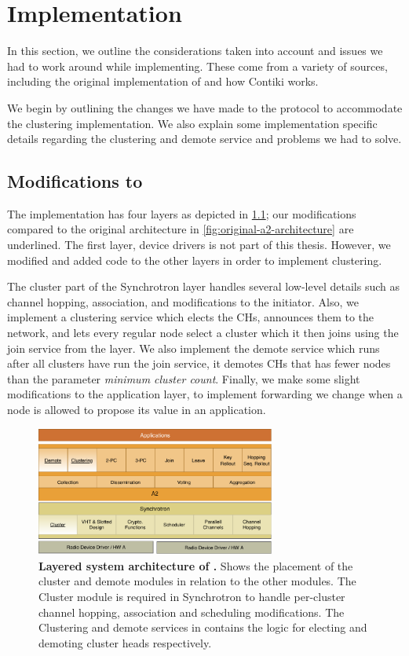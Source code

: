 \chapter{Implementation}
\label{chap:implementation}

In this section, we outline the considerations taken into account and issues we had to work around while implementing. These come from a variety of sources, including the original implementation of \atwo{} and how Contiki works.

We begin by outlining the changes we have made to the \atwo{} protocol to accommodate the clustering implementation. We also explain some implementation specific details regarding the clustering and demote service and problems we had to solve.


\section{Modifications to \atwo{}}
The \atwo{} implementation has four layers as depicted in \cref{fig:a2-architecture}; our modifications compared to the original architecture in \cref{fig:original-a2-architecture} are underlined. The first layer, device drivers is not part of this thesis. However, we modified and added code to the other layers in order to implement clustering.

The cluster part of the Synchrotron layer handles several low-level details such as channel hopping, association, and modifications to the initiator. Also, we implement a clustering service which elects the CHs, announces them to the network, and lets every regular node select a cluster which it then joins using the join service from the \atwo{} layer. We also implement the demote service which runs after all clusters have run the join service, it demotes CHs that has fewer nodes than the parameter \emph{minimum cluster count}. Finally, we make some slight modifications to the application layer, to implement forwarding we change when a node is allowed to propose its value in an application.

\begin{figure}[bt]
    \centering
    \includegraphics[width=0.7\textwidth]{figure/architecture.pdf}
    \caption{\textbf{Layered system architecture of \atwo{} \cite{a2-introduction-paper}.} Shows the placement of the cluster and demote modules in relation to the other modules. The Cluster module is required in Synchrotron to handle per-cluster channel hopping, association and scheduling modifications. The Clustering and demote services in \atwo{} contains the logic for electing and demoting cluster heads respectively.}
    \label{fig:a2-architecture}
\end{figure}

